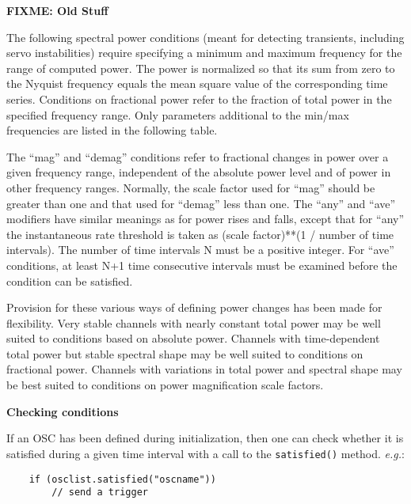 \documentclass[11pt]{article}
\begin{document}
\begin{center}
  \textbf{{\large FIXME: Old Stuff}}
\end{center}



The following spectral power conditions (meant for detecting
transients, including servo instabilities) require specifying a
minimum and maximum frequency for the range of computed power. The
power is normalized so that its sum from zero to the Nyquist frequency
equals the mean square value of the corresponding time
series. Conditions on fractional power refer to the fraction of total
power in the specified frequency range.  Only parameters additional to
the min/max frequencies are listed in the following table.

The ``mag'' and ``demag'' conditions refer to fractional changes in
  power over a given frequency range, independent of the absolute power
level and of power in other frequency ranges. Normally, the scale
factor used for ``mag'' should be greater than one and that used for
``demag'' less than one. The ``any'' and ``ave'' modifiers have
similar meanings as for power rises and falls, except that for ``any''
the instantaneous rate threshold is taken as (scale factor)**(1 /
number of time intervals). The number of time intervals N must be a
positive integer. For ``ave'' conditions, at least N+1 time
consecutive intervals must be examined before the condition can be
satisfied.

Provision for these various ways of defining power changes has been
made for flexibility. Very stable channels with nearly constant total
power may be well suited to conditions based on absolute power.
Channels with time-dependent total power but stable spectral shape may
be well suited to conditions on fractional power. Channels with
variations in total power and spectral shape may be best suited to
conditions on power magnification scale factors.





\begin{center}
\textbf{{\large Checking conditions}}
\end{center}

If an OSC has been defined during initialization, then one can check
whether it is satisfied during a given time interval with a call to
the \texttt{satisfied()} method. \textit{e.g.}:

\begin{verbatim}
    if (osclist.satisfied("oscname"))
        // send a trigger
\end{verbatim}
\end{document}
